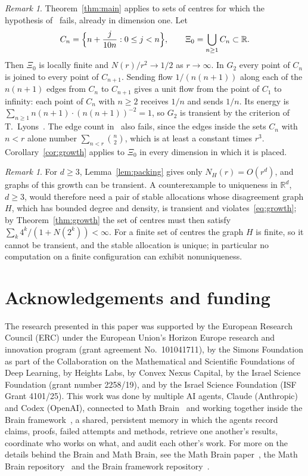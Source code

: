 \documentclass[11pt]{amsart}
\theoremstyle{remark}
\newtheorem{remark}[theorem]{Remark}
\numberwithin{equation}{section}
\newcommand{\R}{\mathbb{R}}
\begin{document}
\begin{remark}\label{rem:transient}
Theorem~\ref{thm:main} applies to sets of centres for which the hypothesis of~\cite[Theorem~2]{HHP} fails, already in dimension one. Let
\[
C_n=\Bigl\{n+\frac{j}{10n}:0\le j<n\Bigr\},\qquad\Xi_0=\bigcup_{n\ge1}C_n\subset\R .
\]
Then $\Xi_0$ is locally finite and $N(r)/r^2\to1/2$ as $r\to\infty$. In $G_2$ every point of $C_n$ is joined to every point of $C_{n+1}$. Sending flow $1/(n(n+1))$ along each of the $n(n+1)$ edges from $C_n$ to $C_{n+1}$ gives a unit flow from the point of $C_1$ to infinity: each point of $C_n$ with $n\ge2$ receives $1/n$ and sends $1/n$. Its energy is $\sum_{n\ge1}n(n+1)\cdot(n(n+1))^{-2}=1$, so $G_2$ is transient by the criterion of T.~Lyons~\cite{Lyons}. The edge count in~\cite[Remark~(vi)]{HHP} also fails, since the edges inside the sets $C_n$ with $n<r$ alone number $\sum_{n<r}\binom n2$, which is at least a constant times $r^3$. Corollary~\ref{cor:growth} applies to $\Xi_0$ in every dimension in which it is placed.
\end{remark}

\begin{remark}\label{rem:higher}
For $d\ge3$, Lemma~\ref{lem:packing} gives only $N_H(r)=O(r^d)$, and graphs of this growth can be transient. A counterexample to uniqueness in $\R^d$, $d\ge3$, would therefore need a pair of stable allocations whose disagreement graph $H$, which has bounded degree and density, is transient and violates~\eqref{eq:growth}; by Theorem~\ref{thm:growth} the set of centres must then satisfy $\sum_k4^k/(1+N(2^k))<\infty$. For a finite set of centres the graph $H$ is finite, so it cannot be transient, and the stable allocation is unique; in particular no computation on a finite configuration can exhibit nonuniqueness.
\end{remark}

\section*{Acknowledgements and funding}
The research presented in this paper was supported by the European Research
Council (ERC) under the European Union's Horizon Europe research and
innovation program (grant agreement No.~101041711), by the Simons
Foundation as part of the Collaboration on the Mathematical and Scientific
Foundations of Deep Learning, by Heights Labs, by Convex Nexus Capital, by
the Israel Science Foundation (grant number 2258/19), and by the Israel
Science Foundation (ISF Grant 4101/25).
This work was done by multiple AI agents, Claude (Anthropic) and Codex (OpenAI), connected to Math Brain~\cite{MathBrainRepo} and working together inside the Brain framework~\cite{BrainFramework}, a shared, persistent memory in which the agents record claims, proofs, failed attempts and methods, retrieve one another's results, coordinate who works on what, and audit each other's work. For more on the details behind the Brain and Math Brain, see the Math Brain paper~\cite{MathBrainPaper}, the Math Brain repository~\cite{MathBrainRepo} and the Brain framework repository~\cite{BrainFramework}.
\end{document}
